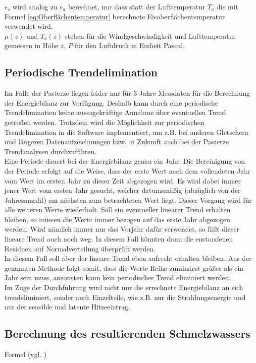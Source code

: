 \documentclass[12pt,a4paper]{article}
\begin{document}
$e_s$ wird analog zu $e_a$ berechnet, nur dass statt der Lufttemperatur $T_a$ die mit Formel \ref{eq:Oberflächentemperatur} berechnete Eisoberflächentemperatur verwendet wird.\\
$\mu(z)$ und $T_a(z)$ stehen für die Windgeschwindigkeit und Lufttemperatur gemessen in Höhe $z$, $P$ für den Luftdruck in Einheit Pascal.


\subsection{Periodische Trendelimination}
Im Falle der Pasterze liegen leider nur für 3 Jahre Messdaten für die Berechnung der Energiebilanz zur Verfügung. Deshalb kann durch eine periodische Trendelimination keine aussagekräftige Annahme über eventuellen Trend getroffen werden. Trotzdem wird die Möglichkeit zur periodischen Trendelimination in die Software implementiert, um z.B. bei anderen Gletschern und längeren Datenaufzeichnungen bzw. in Zukunft auch bei der Pasterze Trendanalysen durchzuführen.\\

Eine Periode dauert bei der Energiebilanz genau ein Jahr. Die Bereinigung von der Periode erfolgt auf die Weise, dass der erste Wert nach dem vollendeten Jahr vom Wert im ersten Jahr zu dieser Zeit abgezogen wird. Es wird dabei immer jener Wert vom ersten Jahr gesucht, welcher datumsmäßig (abzüglich von der Jahresanzahl) am nächsten zum betrachteten Wert liegt. Dieser Vorgang wird für alle weiteren Werte wiederholt. Soll ein eventueller linearer Trend erhalten bleiben, so müssen die Werte immer bezogen auf das erste Jahr abgezogen werden. Wird nämlich immer nur das Vorjahr dafür verwendet, so fällt dieser lineare Trend auch noch weg. In diesem Fall könnten dann die enstandenen Residuen auf Normalverteilung überprüft werden.\\
In diesem Fall soll aber der lineare Trend eben aufrecht erhalten bleiben. Aus der genannten Methode folgt somit, dass die Werte Reihe zumindest größer als ein Jahr sein muss, ansonsten kann kein periodischer Trend eliminiert werden.\\

Im Zuge der Durchführung wird nicht nur die errechnete Energiebilanz an sich trendeliminiert, sonder auch Einzelteile, wie z.B. nur die Strahlungsenergie und nur der sensible und latente Hitzeeintrag.


\subsection{Berechnung des resultierenden Schmelzwassers}
Formel (vgl. \cite[142]{ThePhysicsOfGlaciers})
\end{document}
